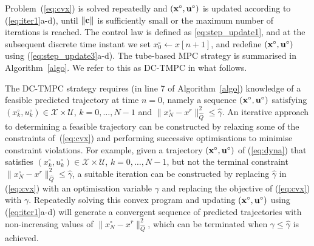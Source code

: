 \documentclass[a4paper, 10 pt, conference]{IEEEconf}
\def\U{\mathcal{U}}
\def\X{\mathcal{X}}
\def\bc{{\bf c}}
\begin{document}
Problem~(\ref{eq:cvx}) is solved repeatedly and $({\bf x}^\circ,{\bf u}^\circ)$ is updated according to (\ref{eq:iter1}a-d), until $\|\bc\|$ is sufficiently small or the maximum number of iterations is reached. The control law is defined as \eqref{eq:step_update1}, and at the subsequent discrete time instant we set $x^\circ_0 \gets  x[n+1]$, and redefine $({\bf x}^\circ,{\bf u}^\circ)$ using (\ref{eq:step_update3}a-d).
%
The tube-based MPC strategy is summarised in Algorithm~\ref{algo}. We refer to this as DC-TMPC in what follows. 

The DC-TMPC strategy requires (in line 7 of Algorithm~\ref{algo}) knowledge of a feasible predicted trajectory at time $n=0$, namely a sequence $({\bf x}^\circ, {\bf u}^\circ)$ satisfying $(x^\circ_k,u^\circ_k)\in\X\times\U$, $k=0,\ldots,N-1$ and $\|x_N^\circ-x^r\|_{\hat{Q}}^2\leq \hat{\gamma}$. 
%
An iterative approach to determining a feasible trajectory can be constructed by relaxing some of the constraints of~(\ref{eq:cvx}) and performing successive optimisations to minimise constraint violations.
%
For example, given a trajectory $({\bf x}^\circ, {\bf u}^\circ)$ of (\ref{eq:dyna}) that satisfies $(x^\circ_k,u^\circ_k)\in\X\times\U$, $k=0,\ldots,N-1$, but not the terminal constraint $\|x_N^\circ-x^r\|_{\hat{Q}}^2\leq \hat{\gamma}$, a suitable iteration can be constructed by replacing $\hat{\gamma}$ in (\ref{eq:cvx}) with an optimisation variable $\gamma$ and replacing the objective of (\ref{eq:cvx}) with $\gamma$. Repeatedly solving this convex program and updating $({\bf x}^\circ, {\bf u}^\circ)$ using (\ref{eq:iter1}a-d) will generate a convergent sequence of predicted trajectories with non-increasing values of $\|x_N^\circ-x^r\|_{\hat{Q}}^2$, which can be terminated when $\gamma \leq \hat{\gamma}$ is achieved.
\end{document}
